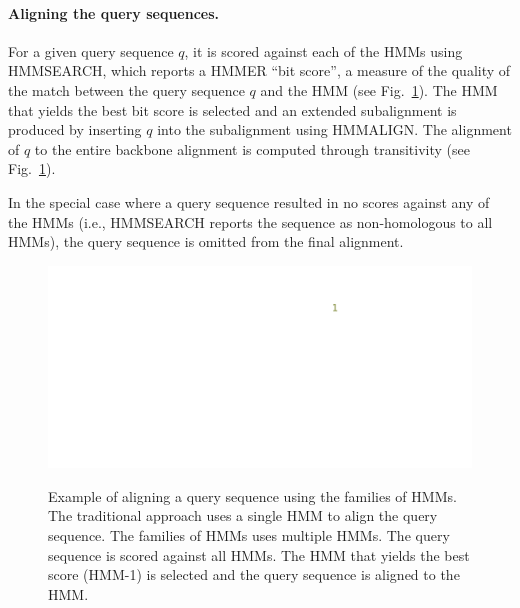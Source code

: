 \paragraph{Aligning the query sequences.}
For a given query sequence $q$, it is scored against each of the HMMs using HMMSEARCH, which reports a HMMER ``bit score'', a measure of the quality of the match between the query sequence $q$ and the HMM (see Fig.~\ref{hmmfamily:alignment}).  The HMM that yields the best bit score is selected and an extended subalignment is produced by inserting $q$ into the subalignment using HMMALIGN.  The alignment of $q$ to the entire backbone alignment is computed through transitivity (see Fig.~\ref{hmmfamily:alignment}).

In the special case where a query sequence resulted in no scores against any of the HMMs (i.e., HMMSEARCH reports the sequence as non-homologous to all HMMs), the query sequence is omitted from the final alignment.  

\begin{figure}[htbp]
\centering
{\includegraphics[width=1.0\textwidth]{hmmfamily/alignment}}
\caption[Example of alignment using HMM families.]{Example of aligning a query sequence using the families of HMMs.  The traditional approach uses a single HMM to align the query sequence.  The families of HMMs uses multiple HMMs.  The query sequence is scored against all HMMs.  The HMM that yields the best score (HMM-1) is selected and the query sequence is aligned to the HMM.} 
\label{hmmfamily:alignment}
\end{figure}

